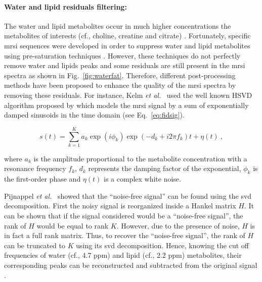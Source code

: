 \paragraph{Water and lipid residuals filtering:} The water and lipid metabolites occur in much higher concentrations the metabolites of interests (cf., choline, creatine and citrate) \cite{Zhu2010,Osorio-Garcia2012}.
Fortunately, specific \ac{mrsi} sequences were developed in order to suppress water and lipid metabolites using pre-saturation techniques \cite{Zhu2010}.
However, these techniques do not perfectly remove water and lipids peaks and some residuals are still present in the \ac{mrsi} spectra as shown in Fig.~\ref{fig:waterfat}.
Therefore, different post-processing methods have been proposed to enhance the quality of the \ac{mrsi} spectra by removing these residuals.
For instance, Kelm \textit{et al.}~\cite{Kelm2007} used the well known HSVD algorithm proposed by \cite{Pijnappel1992} which models the \ac{mrsi} signal by a sum of exponentially damped sinusoids in the time domain (see Eq.~\eqref{eq:fidsig}).

\begin{equation}
	s(t) = \sum_{k=1}^{K} a_{k}\exp(i \phi_k) \exp( -d_{k} + i 2 \pi f_{k} ) t + \eta(t) \ ,
	\label{eq:fidsig}
\end{equation}

\noindent where $a_k$ is the amplitude proportional to the metabolite concentration with a resonance frequency $f_{k}$, $d_k$ represents the damping factor of the exponential, $\phi_k$ is the first-order phase and $\eta(t)$ is a complex white noise. 

Pijnappel \textit{et al.}~\cite{Pijnappel1992} showed that the ``noise-free signal'' can be found using the \ac{svd} decomposition.
First the noisy signal is reorganized inside a Hankel matrix $H$.
It can be shown that if the signal considered would be a ``noise-free signal'', the rank of $H$ would be equal to rank $K$.
However, due to the presence of noise, $H$ is in fact a full rank matrix.
Thus, to recover the ``noise-free signal'', the rank of $H$ can be truncated to $K$ using its \ac{svd} decomposition.
Hence, knowing the cut off frequencies of water (cf., 4.7 ppm) and lipid (cf., 2.2 ppm) metabolites, their corresponding peaks can be reconstructed and subtracted from the original signal \cite{Laudadio2002}.
	
